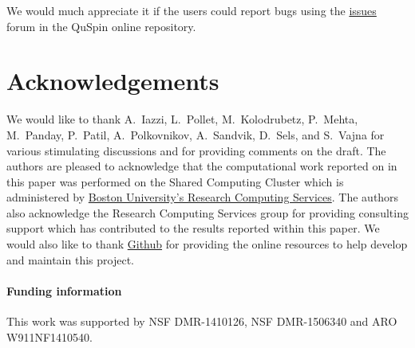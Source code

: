 \documentclass{SciPost}
\newcommand\0{\scalebox{-1}[1]{0}}
\begin{document}
We would much appreciate it if the users could report bugs using the \href{https://github.com/weinbe58/qspin/issues}{issues} forum in the QuSpin online repository.


\section*{Acknowledgements}
We would like to thank  A.~Iazzi, L.~Pollet, M.~Kolodrubetz, P.~Mehta, M.~Panday, P.~Patil, A.~Polkovnikov, A.~Sandvik, D.~Sels, and S.~Vajna for various stimulating discussions and for providing comments on the draft. The authors are pleased to acknowledge that the computational work reported on in this paper was performed on the Shared Computing Cluster which is administered by \href{http://www.bu.edu/tech/support/research/}{Boston University's Research Computing Services}. The authors also acknowledge the Research Computing Services group for providing consulting support which has contributed to the results reported within this paper. We would also like to thank \href{https://github.com/}{Github} for providing the online resources to help develop and maintain this project. 

\paragraph{Funding information}
This work was supported by NSF DMR-1410126, NSF DMR-1506340 and ARO W911NF1410540.
\end{document}
